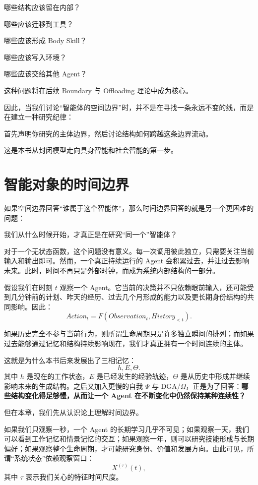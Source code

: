 哪些结构应该留在内部？

哪些应该迁移到工具？

哪些应该形成 Body Skill？

哪些应该写入环境？

哪些应该交给其他 Agent？

这种问题将在后续 Boundary 与 Offloading 理论中成为核心。

因此，当我们讨论“智能体的空间边界”时，并不是在寻找一条永远不变的线，而是在建立一种研究纪律：

\begin{remark}
首先声明你研究的主体边界，然后讨论结构如何跨越这条边界流动。
\end{remark}

这是本书从封闭模型走向具身智能和社会智能的第一步。

\section{智能对象的时间边界}

如果空间边界回答“谁属于这个智能体”，那么时间边界回答的就是另一个更困难的问题：

\begin{remark}
我们从什么时候开始，才真正是在研究“同一个”智能体？
\end{remark}

对于一个无状态函数，这个问题没有意义。每一次调用彼此独立，只需要关注当前输入和输出即可。然而，一个真正持续运行的 Agent 会积累过去，并让过去影响未来。此时，时间不再只是外部时钟，而成为系统内部结构的一部分。

假设我们在时刻 \(t\) 观察一个 Agent。它当前的决策并不只依赖眼前输入，还可能受到几分钟前的计划、昨天的经历、过去几个月形成的能力以及更长期身份结构的共同影响。因此：
\[
Action_t
=
F(
Observation_t,
History_{<t}
).
\]

如果历史完全不参与当前行为，则所谓生命周期只是许多独立瞬间的排列；而如果过去能够通过记忆和结构持续影响现在，我们才真正拥有一个时间连续的主体。

这就是为什么本书后来发展出了三相记忆：
\[
h,E,\Theta.
\]
其中 \(h\) 是现在的工作状态，\(E\) 是已经发生的经验轨迹，\(\Theta\) 是从历史中形成并继续影响未来的生成结构。之后又加入更慢的自我 \(\Psi\) 与 DGA/\(\Omega\)，正是为了回答：\textbf{哪些结构变化得足够慢，从而让一个 Agent 在不断变化中仍然保持某种连续性？}

但在本章，我们先从认识论上理解时间边界。

如果我们只观察一秒，一个 Agent 的长期学习几乎不可见；如果观察一天，我们可以看到工作记忆和情景记忆的交互；如果观察一年，则可以研究技能形成与长期偏好；如果观察整个生命周期，才可能研究身份、价值和发展方向。由此可见，所谓“系统状态”依赖观察窗口：
\[
X^{(\tau)}(t),
\]
其中 \(\tau\) 表示我们关心的特征时间尺度。

